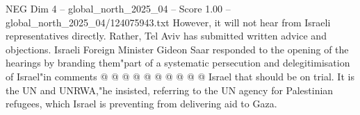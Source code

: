 \begin{textsample}{NEG Dim 4 – global\_north\_2025\_04 – Score 1.00 – global\_north\_2025\_04/124075943.txt}
However, it will not hear from Israeli representatives directly.
Rather, Tel Aviv has submitted written advice and objections.
Israeli Foreign Minister Gideon Saar responded to the opening of the hearings by branding them"part of a systematic persecution and delegitimisation of Israel"in comments @ @ @ @ @ @ @ @ @ @ Israel that should be on trial.
It is the UN and UNRWA,"he insisted, referring to the UN agency for Palestinian refugees, which Israel is preventing from delivering aid to Gaza.

\end{textsample}
